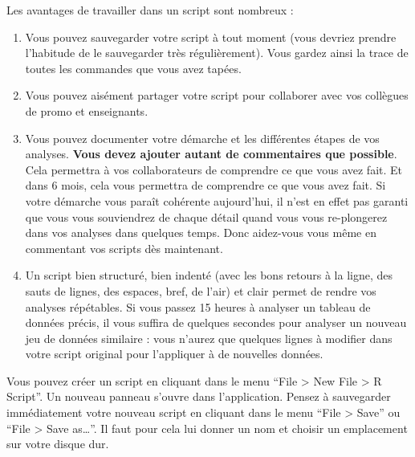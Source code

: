 \documentclass[
  letterpaper,
  DIV=11,
  numbers=noendperiod]{scrreprt}
\providecommand{\tightlist}{%
  \setlength{\itemsep}{0pt}\setlength{\parskip}{0pt}}\usepackage{longtable,booktabs,array}
\begin{document}
Les avantages de travailler dans un script sont nombreux :

\begin{enumerate}
\def\labelenumi{\arabic{enumi}.}
\tightlist
\item
  Vous pouvez sauvegarder votre script à tout moment (vous devriez
  prendre l'habitude de le sauvegarder très régulièrement). Vous gardez
  ainsi la trace de toutes les commandes que vous avez tapées.
\item
  Vous pouvez aisément partager votre script pour collaborer avec vos
  collègues de promo et enseignants.
\item
  Vous pouvez documenter votre démarche et les différentes étapes de vos
  analyses. \textbf{Vous devez ajouter autant de commentaires que
  possible}. Cela permettra à vos collaborateurs de comprendre ce que
  vous avez fait. Et dans 6 mois, cela vous permettra de comprendre ce
  que vous avez fait. Si votre démarche vous paraît cohérente
  aujourd'hui, il n'est en effet pas garanti que vous vous souviendrez
  de chaque détail quand vous vous re-plongerez dans vos analyses dans
  quelques temps. Donc aidez-vous vous même en commentant vos scripts
  dès maintenant.
\item
  Un script bien structuré, bien indenté (avec les bons retours à la
  ligne, des sauts de lignes, des espaces, bref, de l'air) et clair
  permet de rendre vos analyses répétables. Si vous passez 15 heures à
  analyser un tableau de données précis, il vous suffira de quelques
  secondes pour analyser un nouveau jeu de données similaire : vous
  n'aurez que quelques lignes à modifier dans votre script original pour
  l'appliquer à de nouvelles données.
\end{enumerate}

Vous pouvez créer un script en cliquant dans le menu ``File
\textgreater{} New File \textgreater{} R Script''. Un nouveau panneau
s'ouvre dans l'application. Pensez à sauvegarder immédiatement votre
nouveau script en cliquant dans le menu ``File \textgreater{} Save'' ou
``File \textgreater{} Save as\ldots{}''. Il faut pour cela lui donner un
nom et choisir un emplacement sur votre disque dur.
\end{document}
